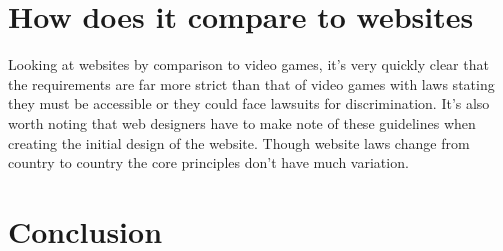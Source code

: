 \documentclass{scrartcl}
\begin{document}
\section{How does it compare to websites}
Looking at websites by comparison to video games, it's very quickly clear that the requirements are far more strict than that of video games with laws stating they must be accessible or they could face lawsuits for discrimination. \cite{caldwell2008web} It's also worth noting that web designers have to make note of these guidelines when creating the initial design of the website. Though website laws change from country to country the core principles don't have much variation.

\section{Conclusion}




\end{document}
